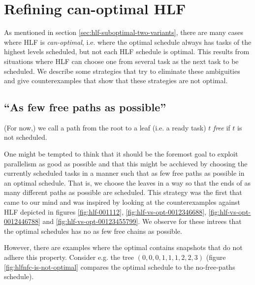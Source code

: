 \section{Refining can-optimal HLF}
\label{sec:suboptimal-hlf-can-optimal-strategies}

As mentioned in section \ref{sec:hlf-suboptimal-two-variants}, there are many cases where HLF is \emph{can-optimal}, i.e. where the optimal schedule always has tasks of the highest levels scheduled, but not each HLF schedule is optimal. This results from situations where HLF can choose one from several task as the next task to be scheduled. We describe some strategies that try to eliminate these ambiguities and give counterexamples that show that these strategies are not optimal.

\subsection{``As few free paths as possible''}
\label{sec:disproving-hlf-no-free-chain}

(For now,) we call a path from the root to a leaf (i.e. a ready task) $t$ \emph{free} if $t$ is not scheduled.

One might be tempted to think that it should be the foremost goal to exploit parallelism as good as possible and that this might be acchieved by choosing the currently scheduled tasks in a manner such that as few free paths as possible in an optimal schedule. That is, we choose the leaves in a way so that the ends of as many different paths as possible are scheduled. This strategy was the first that came to our mind and was inspired by looking at the counterexamples against HLF depicted in figures \ref{fig:hlf-001112}, \ref{fig:hlf-vs-opt-0012346688}, \ref{fig:hlf-vs-opt-0012446788} and \ref{fig:hlf-vs-opt-00123455799}. We observe for these intrees that the optimal schedules has no as few free chains as possible.

However, there are examples where the optimal contains snapshots that do not adhere this property. Consider e.g. the tree $(0,0,0,1,1,1,2,2,3)$ (figure \ref{fig:hlfnfc-is-not-optimal} compares the optimal schedule to the no-free-paths schedule).

